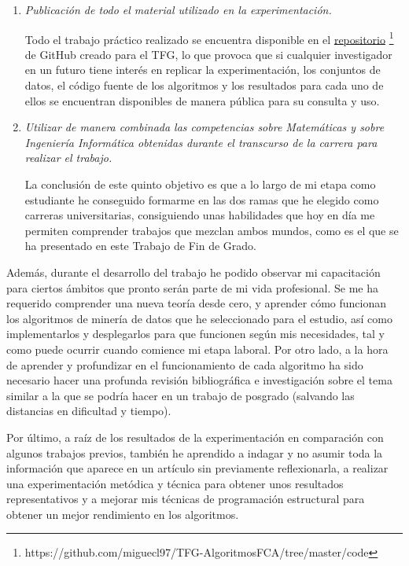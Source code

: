 \documentclass[oneside,openright,titlepage,numbers=noenddot,openany,headinclude,footinclude=true,
cleardoublepage=empty,abstractoff,BCOR=5mm,paper=a4,fontsize=12pt,main=spanish]{scrreprt}
\begin{document}
\begin{enumerate}
    \item \textit{Publicación de todo el material utilizado en la experimentación.}
    
    Todo el trabajo práctico realizado se encuentra disponible en el \href{https://github.com/miguecl97/TFG-AlgoritmosFCA/tree/master/code}{repositorio} \footnote{https://github.com/miguecl97/TFG-AlgoritmosFCA/tree/master/code} de GitHub creado para el TFG, lo que provoca que si cualquier investigador en un futuro tiene interés en replicar la experimentación, los conjuntos de datos, el código fuente de los algoritmos y los resultados para cada uno de ellos se encuentran disponibles de manera pública para su consulta y uso.\\
    
    \item \textit{Utilizar de manera combinada las competencias sobre Matemáticas y sobre Ingeniería Informática obtenidas durante el transcurso de la carrera para realizar el trabajo.}
    
    La conclusión de este quinto objetivo es que a lo largo de mi etapa como estudiante he conseguido formarme en las dos ramas que he elegido como carreras universitarias, consiguiendo unas habilidades que hoy en día me permiten comprender trabajos que mezclan ambos mundos, como es el que se ha presentado en este Trabajo de Fin de Grado.\\
    
\end{enumerate}

Además, durante el desarrollo del trabajo he podido observar mi capacitación para ciertos ámbitos que pronto serán parte de mi vida profesional. Se me ha requerido comprender una nueva teoría desde cero, y aprender cómo funcionan los algoritmos de minería de datos que he seleccionado para el estudio, así como implementarlos y desplegarlos para que funcionen según mis necesidades, tal y como puede ocurrir cuando comience mi etapa laboral. Por otro lado, a la hora de aprender y profundizar en el funcionamiento de cada algoritmo ha sido necesario hacer una profunda revisión bibliográfica e investigación sobre el tema similar a la que se podría hacer en un trabajo de posgrado (salvando las distancias en dificultad y tiempo).

Por último, a raíz de los resultados de la experimentación en comparación con algunos trabajos previos, también he aprendido a indagar y no asumir toda la información que aparece en un artículo sin previamente reflexionarla, a realizar una experimentación metódica y técnica para obtener unos resultados representativos y a mejorar mis técnicas de programación estructural para obtener un mejor rendimiento en los algoritmos. \\
\end{document}
